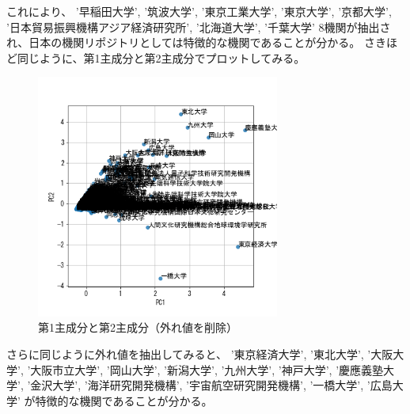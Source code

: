 \documentclass[submit,noauthor]{ono}
\begin{document}
これにより、
'早稲田大学', '筑波大学', '東京工業大学', '東京大学', '京都大学', '日本貿易振興機構アジア経済研究所', '北海道大学', '千葉大学'
8機関が抽出され、日本の機関リポジトリとしては特徴的な機関であることが分かる。
さきほど同じように、第1主成分と第2主成分でプロットしてみる。
\begin{figure}[h]
	\includegraphics[width=8cm]{./picture/pc1pc2_outlier.png}
	\caption{第1主成分と第2主成分（外れ値を削除）}
	\label{fig:pc1pc2_outlier}
\end{figure}

さらに同じように外れ値を抽出してみると、
'東京経済大学', '東北大学', '大阪大学', '大阪市立大学', '岡山大学', '新潟大学', '九州大学', '神戸大学', '慶應義塾大学', '金沢大学', '海洋研究開発機構', '宇宙航空研究開発機構', '一橋大学', '広島大学'
が特徴的な機関であることが分かる。



\onecolumn

\begin{figure}[tb]
	\label{fig:box100000000000000000000000000000}
\end{figure}
\end{document}
